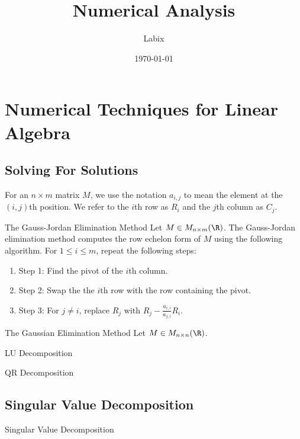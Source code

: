 \documentclass[a4paper]{article}
\title{Numerical Analysis}
\author{Labix}
\date{\today}
\begin{document}
\maketitle
\begin{abstract}
\end{abstract}
\tableofcontents

\pagebreak
\section{Numerical Techniques for Linear Algebra}
\subsection{Solving For Solutions}
For an $n\times m$ matrix $M$, we use the notation $a_{i,j}$ to mean the element at the $(i,j)$th position. We refer to the $i$th row as $R_i$ and the $j$th column as $C_j$. 

\begin{defn}{The Gauss-Jordan Elimination Method}{} Let $M\in M_{n\times m}(\R)$. The Gauss-Jordan elimination method computes the row echelon form of $M$ using the following algorithm. For $1\leq i\leq m$, repeat the following steps: 
\begin{enumerate}
\item Step 1: Find the pivot of the $i$th column. 
\item Step 2: Swap the the $i$th row with the row containing the pivot. 
\item Step 3: For $j\neq i$, replace $R_j$ with $R_j-\frac{a_{i,i}}{a_{j,i}}R_i$. 
\end{enumerate}
\end{defn}

\begin{defn}{The Gaussian Elimination Method}{} Let $M\in M_{n\times n}(\R)$. 
\end{defn}

\begin{defn}{LU Decomposition}{}
\end{defn}

\begin{defn}{QR Decomposition}{}
\end{defn}

\subsection{Singular Value Decomposition}
\begin{defn}{Singular Value Decomposition}{}
\end{defn}
\end{document}
